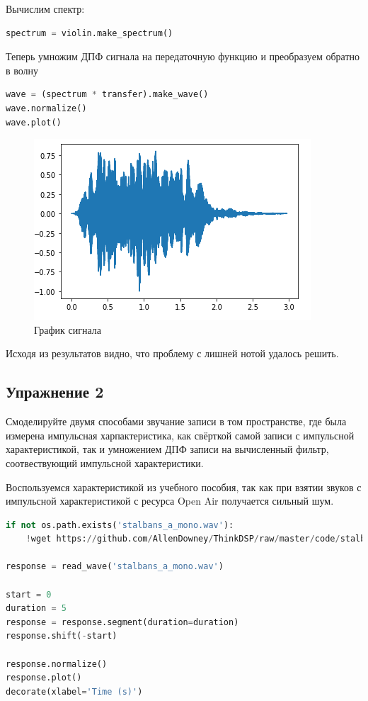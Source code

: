 Вычислим спектр:

\begin{lstlisting}[language=Python]
spectrum = violin.make_spectrum()
\end{lstlisting}

Теперь умножим ДПФ сигнала на передаточную функцию и преобразуем обратно в волну

\begin{lstlisting}[language=Python]
wave = (spectrum * transfer).make_wave()
wave.normalize()
wave.plot()
\end{lstlisting}

\begin{figure}[H]
	\begin{center}
		\includegraphics[scale=1]{fig/lab10/lab10_04.png}
		\caption{График сигнала}
	\end{center}
\end{figure}

Исходя из результатов видно, что проблему с лишней нотой удалось решить.

\subsection{Упражнение 2}

Смоделируйте двумя способами звучание записи в том пространстве, где была измерена импульсная харпактеристика, как свёрткой самой записи с импульсной характеристикой, так и умножением ДПФ записи на вычисленный фильтр, соотвествующий импульсной характеристики.

Воспользуемся характеристикой из учебного пособия, так как при взятии звуков с импульсной характеристикой с ресурса Open Air получается сильный шум.

\begin{lstlisting}[language=Python]
if not os.path.exists('stalbans_a_mono.wav'):
    !wget https://github.com/AllenDowney/ThinkDSP/raw/master/code/stalbans_a_mono.wav

response = read_wave('stalbans_a_mono.wav')

start = 0
duration = 5
response = response.segment(duration=duration)
response.shift(-start)

response.normalize()
response.plot()
decorate(xlabel='Time (s)')
\end{lstlisting}

